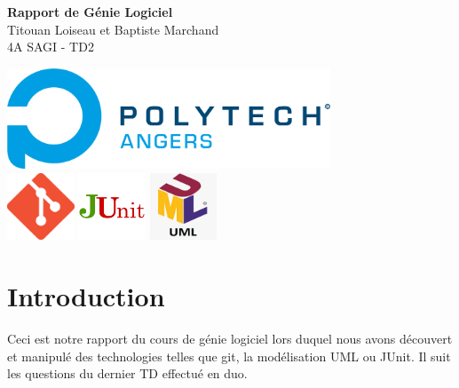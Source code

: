 \documentclass[12pt]{article}
\begin{document}
\begin{titlepage}
    \begin{center}
        \textbf{Rapport de Génie Logiciel} \\
        \vspace{0.5cm}
        Titouan Loiseau et Baptiste Marchand \\
        4A SAGI - TD2 \\
        \vspace{5cm}

        \includegraphics[height=3cm]{img/Polytech_Angers.png} \\
        \includegraphics[height=2cm]{img/git.png}
        \includegraphics[height=2cm]{img/junit.png}
        \includegraphics[height=2cm]{img/uml.png}
    \end{center}
\end{titlepage}

\tableofcontents
\pagebreak

\section*{Introduction}

Ceci est notre rapport du cours de génie logiciel lors duquel nous avons découvert et manipulé des technologies telles que git, la modélisation UML ou JUnit.
Il suit les questions du dernier TD effectué en duo.
\end{document}
